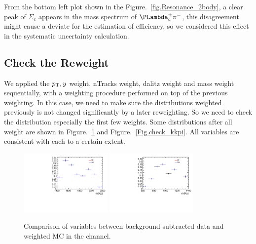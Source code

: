 From the bottom left plot shown in the Figure.~\ref{fig.Resonance_2body}, 
a clear peak of $\Sigma_{c}$ appears in the mass spectrum of $\Lc\pim$, 
this disagreement might cause a deviate for the estimation of efficiency, 
so we considered this effect in the systematic uncertainty calculation. 



\subsection{Check the Reweight}
\label{sec:reweight_check}

We applied the $p_{\mathrm{T}},y$ weight, nTracks weight, \Lc dalitz weight and mass weight sequentially, 
with a weighting procedure performed on top of the previous weighting. 
In this case, 
we need to make sure the distributions weighted previously is not changed significantly by a later reweighting. 
So we need to check the distribution especially the first few weights. 
Some distributions after all weight are shown in Figure.~\ref{Fig.check_pi} and Figure.~\ref{Fig.check_kkpi}. 
All variables are consistent with each to a certain extent.

\begin{figure}[bth]
\centering
\includegraphics[width=0.4\textwidth]{Figures/05_open_charm/04_tune/after_weight_ds/mkp.pdf}%
\includegraphics[width=0.4\textwidth]{Figures/05_open_charm/04_tune/after_weight_ds/mkpi.pdf}\\
\caption{Comparison of variables between background subtracted data and weighted MC in the \LbLcDs channel.}
\label{Fig.check_pi}
\end{figure}


